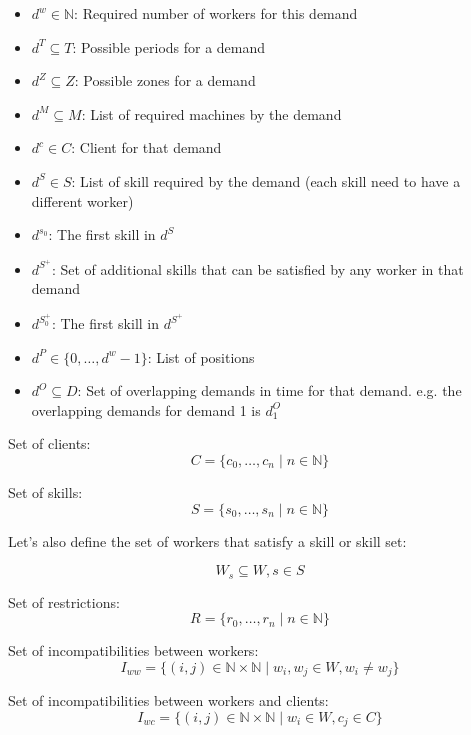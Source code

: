 \documentclass[../thesis.tex]{subfiles}
\begin{document}
\begin{itemize}
    \item $d^w \in \mathbb{N}$: Required number of workers for this demand
    \item $d^T \subseteq T$: Possible periods for a demand
    \item $d^Z \subseteq Z$: Possible zones for a demand
    \item $d^M \subseteq M$: List of required machines by the demand
    \item $d^c \in C$: Client for that demand
    \item $d^S \in S$: List of skill required by the demand (each skill need to have a different worker)
    \item $d^{s_0}$: The first skill in $d^S$
    \item $d^{S^+}$: Set of additional skills that can be satisfied by any worker in that demand
    \item $d^{S^+_0}$: The first skill in $d^{S^+}$
    \item $d^P \in \{ 0, \dots, d^w - 1 \}$: List of positions
    \item $d^O \subseteq D$: Set of overlapping demands in time for that demand. e.g. the overlapping demands for demand 1 is $d_1^O$
\end{itemize}

Set of clients: 
\begin{equation*}
    C = \{ c_0, \dots, c_n \mid n \in \mathbb{N} \}
\end{equation*}

Set of skills: 
\begin{equation*}
    S = \{ s_0, \dots, s_n \mid n \in \mathbb{N} \}
\end{equation*}

Let's also define the set of workers that satisfy a skill or skill set:

\begin{equation*}
    W_s \subseteq W, s \in S
\end{equation*}




Set of restrictions: 
\begin{equation*}
    R = \{ r_0, \dots, r_n \mid n \in \mathbb{N} \}
\end{equation*}


Set of incompatibilities between workers:
\begin{equation*}
    {I_{ww} = \{ ({i},{j}) \in \mathbb{N} \times \mathbb{N} \mid w_i, w_j \in W, w_i \neq w_j \}}
\end{equation*}

Set of incompatibilities between workers and clients:
\begin{equation*}
    I_{wc} = \{ (i, j) \in \mathbb{N} \times \mathbb{N} \mid w_i \in W, c_j \in C \}
\end{equation*}
\end{document}
